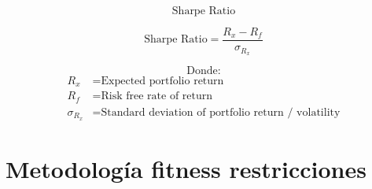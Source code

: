\documentclass[9pt,a4paper,twoside]{rho-class/rho}
\begin{document}
        \[ \text{Sharpe Ratio} \]

        \[ \text{Sharpe Ratio} = \frac{R_x - R_f}{\sigma_{R_x}} \]

        \[ \text{Donde:} \]
        \begin{align*}
            R_x &= \text{Expected portfolio return} \\
            R_f &= \text{Risk free rate of return} \\
            \sigma_{R_x} &= \text{Standard deviation of portfolio return / volatility}
        \end{align*}
    
    \section{Metodología fitness restricciones}
            
\end{document}
